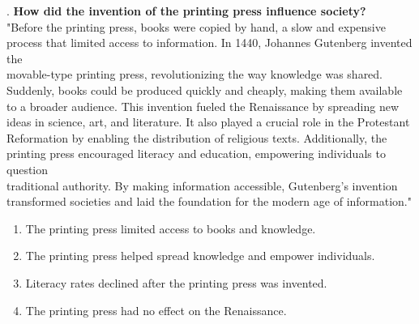 \documentclass[12pt]{article}
\begin{document}
\vspace{1cm}
. \textbf{How did the invention of the printing press influence society?\\}
"Before the printing press, books were copied by hand, a slow and expensive process that limited access to information. In 1440, Johannes Gutenberg invented the \\movable-type printing press, revolutionizing the way knowledge was shared. \\Suddenly, books could be produced quickly and cheaply, making them available to a broader audience. This invention fueled the Renaissance by spreading new ideas in science, art, and literature. It also played a crucial role in the Protestant Reformation by enabling the distribution of religious texts. Additionally, the printing press encouraged literacy and education, empowering individuals to question \\traditional authority. By making information accessible, Gutenberg’s invention \\transformed societies and laid the foundation for the modern age of information."\\
\begin{enumerate}[label=\Alph*.]
    \item The printing press limited access to books and knowledge.  
    \item The printing press helped spread knowledge and empower individuals.  
    \item Literacy rates declined after the printing press was invented.  
    \item The printing press had no effect on the Renaissance.  
\end{enumerate}

\vspace{1cm}
\end{document}
